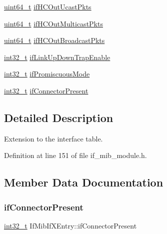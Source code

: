 \begin{DoxyCompactItemize}
\item 
\hyperlink{stdint_8h_aec6fcb673ff035718c238c8c9d544c47}{uint64\+\_\+t} \hyperlink{structIfMibIfXEntry_ac9f79792ea4eb605a0a68a2ecd8fd206}{if\+H\+C\+Out\+Ucast\+Pkts}
\item 
\hyperlink{stdint_8h_aec6fcb673ff035718c238c8c9d544c47}{uint64\+\_\+t} \hyperlink{structIfMibIfXEntry_a8d3636e9c5083e1e40f63eb948e8a52b}{if\+H\+C\+Out\+Multicast\+Pkts}
\item 
\hyperlink{stdint_8h_aec6fcb673ff035718c238c8c9d544c47}{uint64\+\_\+t} \hyperlink{structIfMibIfXEntry_a6941cc526adb35d49f3110da4671cc43}{if\+H\+C\+Out\+Broadcast\+Pkts}
\item 
\hyperlink{stdint_8h_ab1967d8591af1a4e48c37fd2b0f184d0}{int32\+\_\+t} \hyperlink{structIfMibIfXEntry_a8083fbfc4f3dbc7846bc4bf14de32763}{if\+Link\+Up\+Down\+Trap\+Enable}
\item 
\hyperlink{stdint_8h_ab1967d8591af1a4e48c37fd2b0f184d0}{int32\+\_\+t} \hyperlink{structIfMibIfXEntry_a2d8b6d9eb34768f204a4ab8921798aa4}{if\+Promiscuous\+Mode}
\item 
\hyperlink{stdint_8h_ab1967d8591af1a4e48c37fd2b0f184d0}{int32\+\_\+t} \hyperlink{structIfMibIfXEntry_aaa054ec79edc2fd779de985eac9d2549}{if\+Connector\+Present}
\end{DoxyCompactItemize}


\subsection{Detailed Description}
Extension to the interface table. 

Definition at line 151 of file if\+\_\+mib\+\_\+module.\+h.



\subsection{Member Data Documentation}
\mbox{\label{structIfMibIfXEntry_aaa054ec79edc2fd779de985eac9d2549}} 
\subsubsection{\texorpdfstring{if\+Connector\+Present}{ifConnectorPresent}}
{\footnotesize\ttfamily \hyperlink{stdint_8h_ab1967d8591af1a4e48c37fd2b0f184d0}{int32\+\_\+t} If\+Mib\+If\+X\+Entry\+::if\+Connector\+Present}



